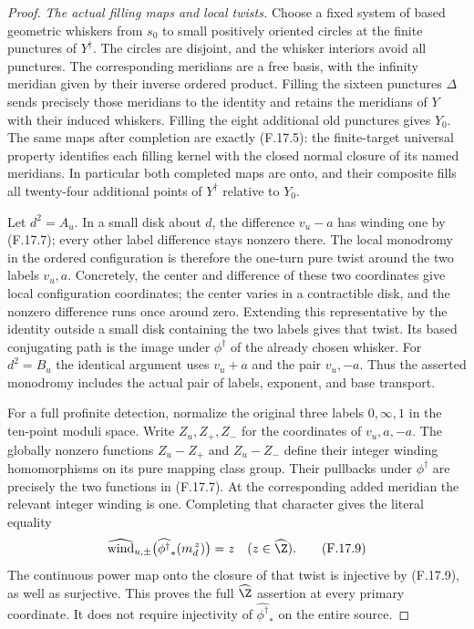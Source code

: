 \begin{proof}
\emph{The actual filling maps and local twists.}
Choose a fixed system of based geometric whiskers
from $s_0$ to small positively oriented circles at
the finite punctures of $Y^\dagger$.
The circles are disjoint, and the whisker interiors
avoid all punctures.
The corresponding meridians are a free basis, with
the infinity meridian given by their inverse ordered
product.
Filling the sixteen punctures $\Delta$ sends precisely
those meridians to the identity and retains the
meridians of $Y$ with their induced whiskers.
Filling the eight additional old punctures gives $Y_0$.
The same maps after completion are exactly (F.17.5):
the finite-target universal property identifies
each filling kernel with the closed normal closure
of its named meridians.  In particular both completed
maps are onto, and their composite fills all twenty-four
additional points of $Y^\dagger$ relative to $Y_0$.

Let $d^2=A_u$.
In a small disk about $d$, the difference $v_u-a$
has winding one by (F.17.7); every other label
difference stays nonzero there.
The local monodromy in the ordered configuration
is therefore the one-turn pure twist around the
two labels $v_u,a$.
Concretely, the center and difference of these two
coordinates give local configuration coordinates;
the center varies in a contractible disk, and the
nonzero difference runs once around zero.
Extending this representative by the identity outside
a small disk containing the two labels gives that
twist.  Its based conjugating path is the image
under $\phi^\dagger$ of the already chosen whisker.
For $d^2=B_u$ the identical argument uses $v_u+a$
and the pair $v_u,-a$.
Thus the asserted monodromy includes the actual
pair of labels, exponent, and base transport.

For a full profinite detection, normalize the original
three labels $0,\infty,1$ in the ten-point moduli space.
Write $Z_u,Z_+,Z_-$ for the coordinates of $v_u,a,-a$.
The globally nonzero functions $Z_u-Z_+$ and $Z_u-Z_-$
define their integer winding homomorphisms on its
pure mapping class group.
Their pullbacks under $\phi^\dagger$ are precisely
the two functions in (F.17.7).
At the corresponding added meridian the relevant
integer winding is one.  Completing that character
gives the literal equality
\[
 \widehat{\operatorname{wind}}_{u,\pm}
       \bigl(\widehat{\phi^\dagger}_*(m_d^{\,z})\bigr)
                         =z\quad(z\in\widehat\Z).
                                                               \tag{F.17.9}
\]
The continuous power map onto the closure of that
twist is injective by (F.17.9), as well as surjective.
This proves the full $\widehat\Z$ assertion at every
primary coordinate.  It does not require injectivity
of $\widehat{\phi^\dagger}_*$ on the entire source.


\end{proof}
